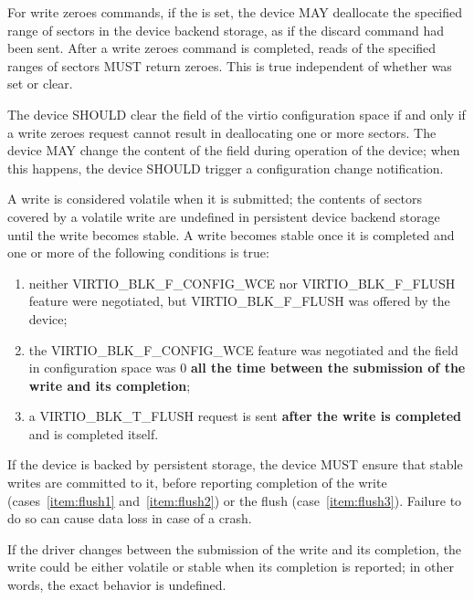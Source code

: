 For write zeroes commands, if the  is set, the device MAY
deallocate the specified range of sectors in the device backend storage,
as if the discard command had been sent.  After a write zeroes command
is completed, reads of the specified ranges of sectors MUST return
zeroes.  This is true independent of whether  was set or clear.

The device SHOULD clear the  field of the
virtio configuration space if and only if a write zeroes request cannot
result in deallocating one or more sectors.  The device MAY change the
content of the field during operation of the device; when this happens,
the device SHOULD trigger a configuration change notification.

A write is considered volatile when it is submitted; the contents of
sectors covered by a volatile write are undefined in persistent device
backend storage until the write becomes stable.  A write becomes stable
once it is completed and one or more of the following conditions is true:

\begin{enumerate}
\item\label{item:flush1} neither VIRTIO_BLK_F_CONFIG_WCE nor
  VIRTIO_BLK_F_FLUSH feature were negotiated, but VIRTIO_BLK_F_FLUSH was
  offered by the device;

\item\label{item:flush2} the VIRTIO_BLK_F_CONFIG_WCE feature was negotiated and the
   field in configuration space was 0 \textbf{all the time between
  the submission of the write and its completion};

\item\label{item:flush3} a VIRTIO_BLK_T_FLUSH request is sent \textbf{after the write is
  completed} and is completed itself.
\end{enumerate}

If the device is backed by persistent storage, the device MUST ensure that
stable writes are committed to it, before reporting completion of the write
(cases~\ref{item:flush1} and~\ref{item:flush2}) or the flush
(case~\ref{item:flush3}).  Failure to do so can cause data loss
in case of a crash.

If the driver changes  between the submission of the write
and its completion, the write could be either volatile or stable when
its completion is reported; in other words, the exact behavior is undefined.

%

